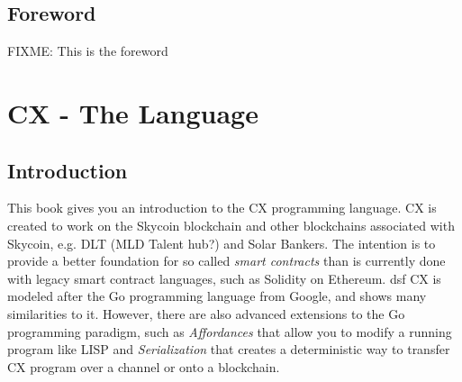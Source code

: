 \documentclass[11pt,fleqn,openany]{book} %
\begin{document}
\noindent \textit{} %



\pagestyle{empty} %

\tableofcontents %


\pagestyle{fancy} %


\chapter*{Foreword}

FIXME: This is the foreword

\part{CX - The Language}


 
\chapter{Introduction}
\label{chapter:introduction}

This book gives you an introduction to the CX programming language. CX is created to work on the Skycoin blockchain and other blockchains associated with Skycoin, e.g. DLT (MLD Talent hub?) and Solar Bankers.  The intention is to provide a better foundation for so called \emph{smart contracts} than is currently done with legacy smart contract languages, such as Solidity on Ethereum.
dsf
CX is modeled after the Go programming language from Google, and shows many similarities to it. However, there are also advanced extensions to the Go programming paradigm, such as \emph{Affordances} that allow you to modify a running program like LISP and \emph{Serialization} that creates a deterministic way to transfer CX program over a channel or onto a blockchain.
\end{document}
